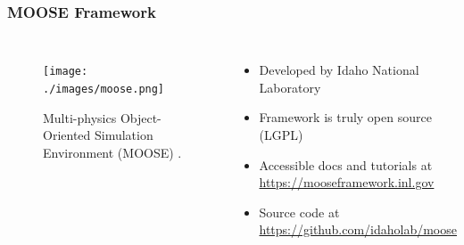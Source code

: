 \begin{frame}
  \frametitle{MOOSE Framework}
  \begin{columns}
    \column[t]{6cm}
  \begin{figure}[t]
     \vspace{-0.25in}
       \hspace*{-0.25in}
       \texttt{[image: ./images/moose.png]}
            \caption{Multi-physics Object-Oriented Simulation Environment 
            (MOOSE) 
            \cite{gaston_physics-based_2015,permann2020moose,lindsay2021automatic}.}
  \end{figure}
        \column[t]{4cm}
          \begin{itemize}
                  \item Developed by Idaho National Laboratory 
                          \cite{gaston_physics-based_2015,permann2020moose,lindsay2021automatic}
                  \item Framework is truly open source (LGPL)
                  \item Accessible docs and tutorials at \url{https://mooseframework.inl.gov}
                  \item Source code at \url{https://github.com/idaholab/moose}
          \end{itemize}

  \end{columns}
\end{frame}



